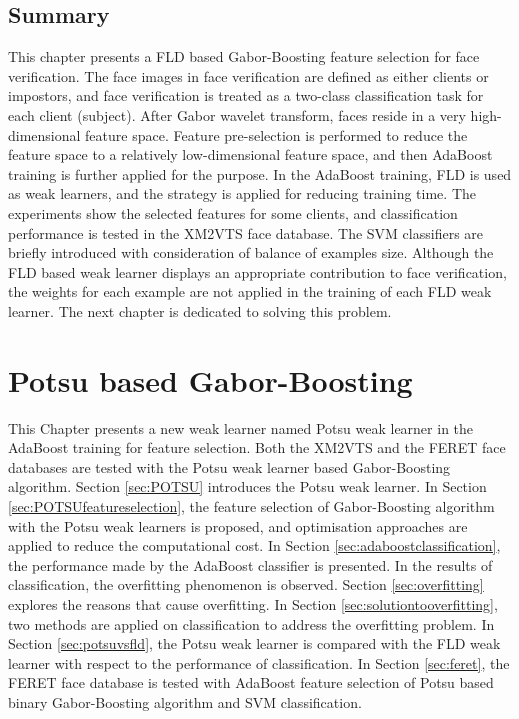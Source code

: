 \section{Summary}
This chapter presents a FLD based Gabor-Boosting feature selection for face verification. The face images in face verification are defined as either clients or impostors, and face verification is treated as a two-class classification task for each client (subject). After Gabor wavelet transform, faces reside in a very high-dimensional feature space. Feature pre-selection is performed to reduce the feature space to a relatively low-dimensional feature space, and then AdaBoost training is further applied for the purpose. In the AdaBoost training, FLD is used as weak learners, and the strategy is applied for reducing training time. The experiments show the selected features for some clients, and classification performance is tested in the \mbox{XM2VTS} face database. The SVM classifiers are briefly introduced with consideration of balance of examples size. Although the FLD based weak learner displays an appropriate contribution to face verification, the weights for each example are not applied in the training of each FLD weak learner. The next chapter is dedicated to solving this problem.

\chapter{Potsu based Gabor-Boosting}
\label{ch:binary}
This Chapter presents a new weak learner named Potsu weak learner in the AdaBoost training for feature selection. Both the \mbox{XM2VTS} and the \mbox{FERET} face databases are tested with the Potsu weak learner based Gabor-Boosting algorithm. \mbox{Section} \ref{sec:POTSU} introduces the Potsu weak learner. In \mbox{Section} \ref{sec:POTSUfeatureselection}, the feature selection of Gabor-Boosting algorithm with the Potsu weak learners is proposed, and optimisation approaches are applied to reduce the computational cost. In \mbox{Section} \ref{sec:adaboostclassification}, the performance made by the AdaBoost classifier is presented. In the results of classification, the overfitting phenomenon is observed. \mbox{Section} \ref{sec:overfitting} explores the reasons that cause overfitting. In \mbox{Section} \ref{sec:solutiontooverfitting}, two methods are applied on classification to address the overfitting problem. In \mbox{Section} \ref{sec:potsuvsfld}, the Potsu weak learner is compared with the FLD weak learner with respect to the performance of classification. In \mbox{Section} \ref{sec:feret}, the \mbox{FERET} face database is tested with AdaBoost feature selection of Potsu based binary Gabor-Boosting algorithm and SVM classification.


